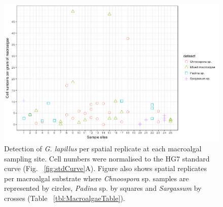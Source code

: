 \documentclass[12pt]{article}
\begin{document}
\begin{figure} 
\includegraphics[scale=.75]{Hero_qpcr-figs/Fig6.png}
\caption{Detection of \emph{G. lapillus} per spatial replicate at each macroalgal sampling site. Cell numbers were normalised to the HG7 standard curve (Fig. ~\ref{fig:stdCurve}A). Figure also shows spatial replicates per macroalgal substrate where \emph{Chnoospora} sp. samples are represented by circles, \emph{Padina} sp. by squares and \textit{Sargassum} by crosses (Table ~\ref{tbl:MacroalgaeTable}).} 
\label{fig:envHG7}
\end{figure} 
\FloatBarrier


\newpage
\end{document}
